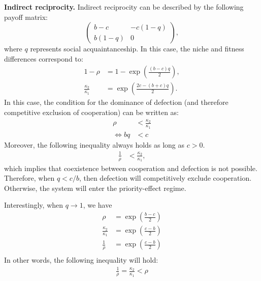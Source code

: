 \documentclass[12pt]{article}
\begin{document}
\textbf{Indirect reciprocity.}
Indirect reciprocity can be described by the following payoff matrix:
\begin{equation}
\begin{pmatrix}
b-c & -c(1-q) \\
b(1-q) & 0
\end{pmatrix},
\end{equation}
where $q$ represents social acquaintanceship.
In this case, the niche and fitness differences correspond to:
\begin{align}
1-\rho &= 1- \exp\left(\frac{(b-c)q}{2}\right),\\
\frac{\kappa_2}{\kappa_1} &= \exp\left(\frac{2c-(b+c)q}{2}\right).
\end{align}
In this case, the condition for the dominance of defection (and therefore competitive exclusion of cooperation) can be written as:
\begin{align}
\rho &< \frac{\kappa_2}{\kappa_1}\\
\iff bq  &< c
\end{align}
Moreover, the following inequality always holds as long as $c > 0$.
\begin{align}
\frac{1}{\rho} &< \frac{\kappa_2}{\kappa_1},
\end{align}
which implies that coexistence between cooperation and defection is not possible.
Therefore, when $q < c/b$, then defection will competitively exclude cooperation. 
Otherwise, the system will enter the priority-effect regime.

Interestingly, when $q \to 1$, we have 
\begin{align}
\rho &= \exp\left(\frac{b-c}{2}\right)\\
\frac{\kappa_2}{\kappa_1} &= \exp\left(\frac{c-b}{2}\right)\\
\frac{1}{\rho} &= \exp\left(\frac{c-b}{2}\right)\\
\end{align}
In other words, the following inequality will hold:
\begin{align}
\frac{1}{\rho} = \frac{\kappa_2}{\kappa_1} < \rho 
\end{align}
\end{document}
